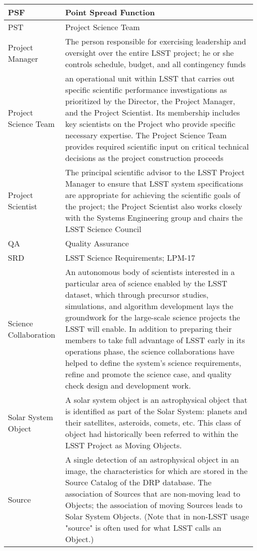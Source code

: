 \begin{longtable}{|l|p{}|}
PSF & Point Spread Function \\\hline
PST & \gls{Project Science Team} \\\hline
Project Manager & The person responsible for exercising leadership and oversight over the entire LSST project; he or she controls schedule, budget, and all contingency funds \\\hline
Project Science Team & an operational unit within LSST that carries out specific scientific performance investigations as prioritized by the Director, the Project Manager, and the Project Scientist. Its membership includes key scientists on the Project who provide specific necessary expertise. The Project Science Team provides required scientific input on critical technical decisions as the project construction proceeds \\\hline
Project Scientist & The principal scientific advisor to the LSST Project Manager to ensure that LSST system specifications are appropriate for achieving the scientific goals of the project; the Project Scientist also works closely with the Systems Engineering group and chairs the LSST Science Council \\\hline
QA & Quality Assurance \\\hline
SRD & LSST Science Requirements; LPM-17 \\\hline
Science Collaboration & An autonomous body of scientists interested in a particular area of science enabled by the LSST dataset, which through precursor studies, simulations, and algorithm development lays the groundwork for the large-scale science projects the LSST will enable.  In addition to preparing their members to take full advantage of LSST early in its operations phase, the science collaborations have helped to define the system's science requirements, refine and promote the science case, and quality check design and development work. \\\hline
Solar System Object & A solar system object is an astrophysical object that is identified as part of the Solar System: planets and their satellites, asteroids, comets, etc. This class of object had historically been referred to within the LSST Project as Moving Objects. \\\hline
Source & A single detection of an astrophysical object in an image, the characteristics for which are stored in the Source Catalog of the DRP database. The association of Sources that are non-moving lead to Objects; the association of moving Sources leads to Solar System Objects. (Note that in non-LSST usage "source" is often used for what LSST calls an Object.) \\\hline

\end{longtable}
